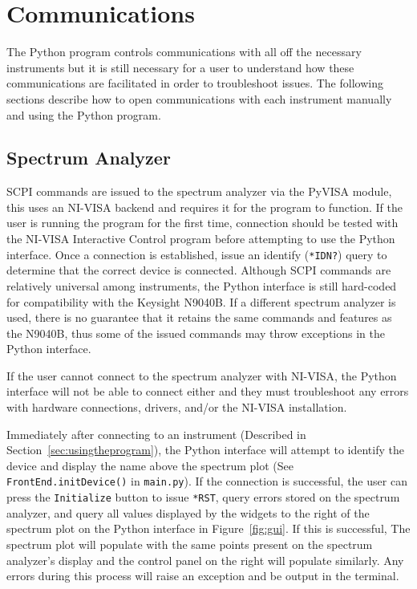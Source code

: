 \documentclass[titlepage]{article}
\begin{document}
\section{Communications}\label{sec:comms}
The Python program controls communications with all off the necessary instruments but it is still necessary for a user to understand how these communications are facilitated in order to troubleshoot issues. The following sections describe how to open communications with each instrument manually and using the Python program.

\subsection{Spectrum Analyzer}\label{sec:commssa}
SCPI commands are issued to the spectrum analyzer via the PyVISA module, this uses an NI-VISA backend and requires it for the program to function. If the user is running the program for the first time, connection should be tested with the NI-VISA Interactive Control program before attempting to use the Python interface. Once a connection is established, issue an identify (\verb|*IDN?|) query to determine that the correct device is connected. Although SCPI commands are relatively universal among instruments, the Python interface is still hard-coded for compatibility with the Keysight N9040B. If a different spectrum analyzer is used, there is no guarantee that it retains the same commands and features as the N9040B, thus some of the issued commands may throw exceptions in the Python interface. 

If the user cannot connect to the spectrum analyzer with NI-VISA, the Python interface will not be able to connect either and they must troubleshoot any errors with hardware connections, drivers, and/or the NI-VISA installation.

Immediately after connecting to an instrument (Described in Section~\ref{sec:usingtheprogram}), the Python interface will attempt to identify the device and display the name above the spectrum plot (See \verb|FrontEnd.initDevice()| in \verb|main.py|). If the connection is successful, the user can press the \verb|Initialize| button to issue \verb|*RST|, query errors stored on the spectrum analyzer, and query all values displayed by the widgets to the right of the spectrum plot on the Python interface in Figure~\ref{fig:gui}. If this is successful, The spectrum plot will populate with the same points present on the spectrum analyzer's display and the control panel on the right will populate similarly. Any errors during this process will raise an exception and be output in the terminal.
\end{document}
